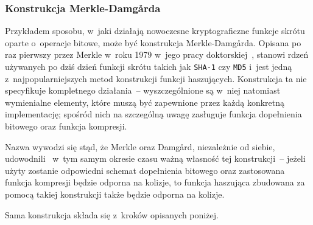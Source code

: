 \documentclass[12pt,a4paper,twoside]{article}
\begin{document}
\subsubsection{Konstrukcja Merkle-Damg\r{a}rda}
Przykładem sposobu, w~jaki działają nowoczesne kryptograficzne funkcje skrótu
oparte o~operacje bitowe, może być konstrukcja Merkle-Damg\r{a}rda. Opisana po
raz pierwszy przez Merkle w~roku 1979 w~jego pracy
doktorskiej~\cite{merkle_damgard_construction}, stanowi rdzeń używanych po dziś
dzień funkcji skrótu takich jak \texttt{SHA-1} czy \texttt{MD5} i~jest jedną
z~najpopularniejszych metod konstrukcji funkcji haszujących. Konstrukcja ta nie
specyfikuje kompletnego działania~-- wyszczególnione są w~niej natomiast
wymienialne elementy, które muszą być zapewnione przez każdą konkretną
implementację; spośród nich na szczególną uwagę zasługuje funkcja dopełnienia
bitowego oraz funkcja kompresji.

Nazwa wywodzi się stąd, że Merkle oraz Damg\r{a}rd, niezależnie od siebie,
udowodnili~\cite{merkle_damgard_security1,merkle_damgard_security2} w~tym samym
okresie czasu ważną własność tej konstrukcji~-- jeżeli użyty zostanie
odpowiedni schemat dopełnienia bitowego oraz zastosowana funkcja kompresji
będzie odporna na kolizje, to funkcja haszująca zbudowana za pomocą takiej
konstrukcji także będzie odporna na kolizje.

Sama konstrukcja składa się z~kroków opisanych poniżej.
\end{document}
